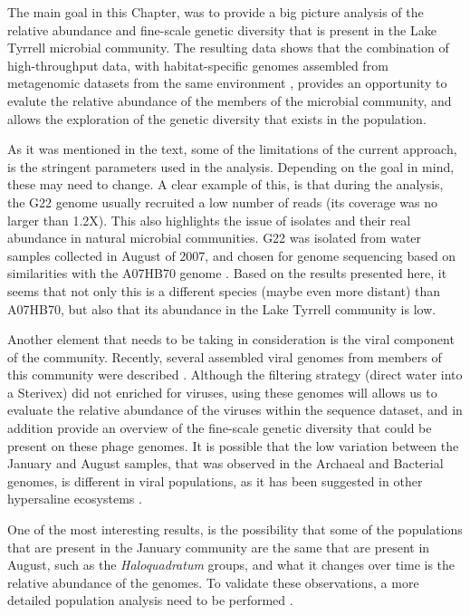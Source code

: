 The main goal in this Chapter, was to provide a big picture analysis of the relative abundance and fine-scale genetic diversity that is present in the Lake Tyrrell microbial community. The resulting data shows that the combination of high-throughput data, with habitat-specific genomes assembled from metagenomic datasets from the same environment \cite{Narasingarao:2012kp,Podell:2013kx,Podell:2013fp}, provides an opportunity to evalute the relative abundance of the members of the microbial community, and allows the exploration of the genetic diversity that exists in the population.

As it was mentioned in the text, some of the limitations of the current approach, is the stringent parameters used in the analysis. Depending on the goal in mind, these may need to change. A clear example of this, is that during the analysis, the G22 genome usually recruited a low number of reads (its coverage was no larger than 1.2X). This also highlights the issue of isolates and their real abundance in natural microbial communities. G22 was isolated from water samples collected in August of 2007, and chosen for genome sequencing based on similarities with the A07HB70 genome \cite{Ugalde:2013hb}. Based on the results presented here, it seems that not only this is a different species (maybe even more distant) than A07HB70, but also that its abundance in the Lake Tyrrell community is low. 

Another element that needs to be taking in consideration is the viral component of the community. Recently, several assembled viral genomes from members of this community were described \cite{Emerson:2012gh,Emerson:2013ck}. Although the filtering strategy (direct water into a Sterivex) did not enriched for viruses, using these genomes will allows us to evaluate the relative abundance of the viruses within the sequence dataset, and in addition provide an overview of the fine-scale genetic diversity that could be present on these phage genomes. It is possible that the low variation between the January and August samples, that was observed in the Archaeal and Bacterial genomes, is different in viral populations, as it has been suggested in other hypersaline ecosystems \cite{RodriguezBrito:2010in}.

One of the most interesting results, is the possibility that some of the populations that are present in the January community are the same that are present in August, such as the \textit{Haloquadratum} groups, and what it changes over time is the relative abundance of the genomes. To validate these observations, a more detailed population analysis need to be performed \cite{Schloissnig:2012hx,Kryazhimskiy:2008hq,Whitaker:2006gf}.

